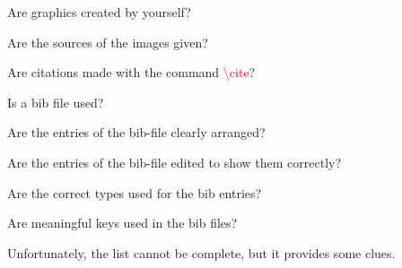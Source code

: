 \begin{todolist}
    \item Are graphics created by yourself?
    \item Are the sources of the images given?
    \item Are citations made with the command \textcolor{red}{\textbackslash cite}?
    \item Is a bib file used?
    \item Are the entries of the bib-file clearly arranged? 
    \item Are the entries of the bib-file edited to show them correctly?
    \item Are the correct types used for the bib entries?
    \item Are meaningful keys used in the bib files?
\end{todolist}

\bigskip

Unfortunately, the list cannot be complete, but it provides some clues.